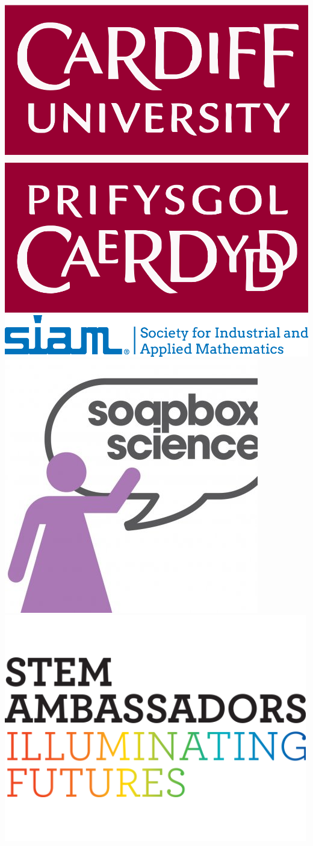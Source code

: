 \documentclass{beamer}
\begin{document}
\begin{frame}
    \begin{center}
        \includegraphics[width=.3\textwidth]{img/cardiff_uni_logo.jpg} \hspace{1cm}
        \includegraphics[width=.4\textwidth]{img/siam.png}
        \vfill
        \includegraphics[width=.3\textwidth]{img/soapbox.jpg} \hspace{1cm}
        \includegraphics[width=.4\textwidth]{img/stem.png}
    \end{center}
\end{frame}
\end{document}
